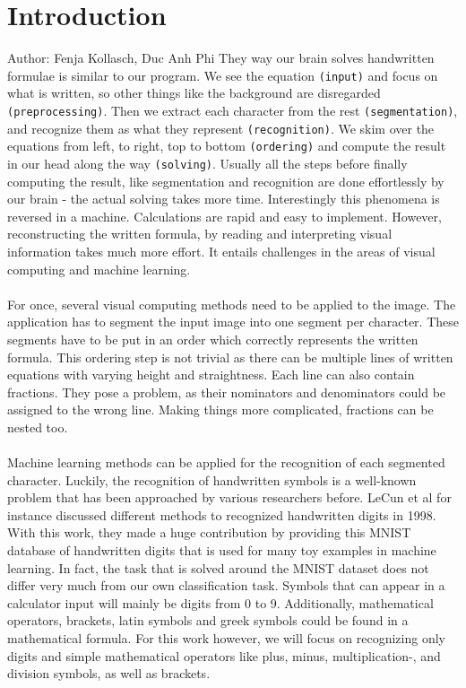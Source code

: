 \documentclass[11pt]{article}
\begin{document}
	\section{Introduction}
		\small{Author: Fenja Kollasch, Duc Anh Phi} \newline \newline
	They way our brain solves handwritten formulae is similar to our program. We see the equation \texttt{(input)} and focus on what is written, so other things like the background are disregarded \texttt{(preprocessing)}. Then we extract each character from the rest \texttt{(segmentation)}, and recognize them as what they represent \texttt{(recognition)}. We skim over the equations from left, to right, top to bottom \texttt{(ordering)} and compute the result in our head along the way \texttt{(solving)}. Usually all the steps before finally computing the result, like segmentation and recognition are done effortlessly by our brain - the actual solving takes more time. Interestingly this phenomena is reversed in a machine. Calculations are rapid and easy to implement. However, reconstructing the written formula, by reading and interpreting visual information takes much more effort. It entails challenges in the areas of visual computing and machine learning.\\\\
	For once, several visual computing methods need to be applied to the image. The application has to segment the input image into one segment per character. These segments have to be put in an order which correctly represents the written formula. This ordering step is not trivial as there can be multiple lines of written equations with varying height and straightness. Each line can also contain fractions. They pose a problem, as their nominators and denominators could be assigned to the wrong line. Making things more complicated, fractions can be nested too.\\\\
	Machine learning methods can be applied for the recognition of each segmented character. Luckily, the recognition of handwritten symbols is a well-known problem that has been approached by various researchers before. LeCun et al \cite{lecun1998} for instance discussed different methods to recognized handwritten digits in 1998. With this work, they made a huge contribution by providing this MNIST database of handwritten digits \cite{mnist} that is used for many toy examples in machine learning. In fact, the task that is solved around the MNIST dataset does not differ very much from our own classification task. Symbols that can appear in a calculator input will mainly be digits from 0 to 9. Additionally, mathematical operators, brackets, latin symbols and greek symbols could be found in a mathematical formula. For this work however, we will focus on recognizing only digits and simple mathematical operators like plus, minus, multiplication-, and division symbols, as well as brackets.\\\\
\end{document}
